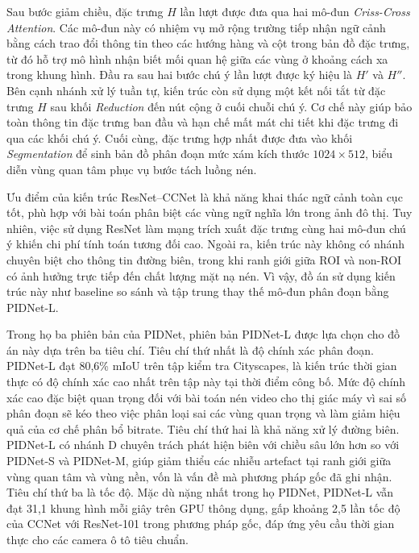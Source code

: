 Sau bước giảm chiều, đặc trưng $H$ lần lượt được đưa qua hai mô-đun \textit{Criss-Cross Attention}. Các mô-đun này có nhiệm vụ mở rộng trường tiếp nhận ngữ cảnh bằng cách trao đổi thông tin theo các hướng hàng và cột trong bản đồ đặc trưng, từ đó hỗ trợ mô hình nhận biết mối quan hệ giữa các vùng ở khoảng cách xa trong khung hình. Đầu ra sau hai bước chú ý lần lượt được ký hiệu là $H'$ và $H''$. Bên cạnh nhánh xử lý tuần tự, kiến trúc còn sử dụng một kết nối tắt từ đặc trưng $H$ sau khối \textit{Reduction} đến nút cộng ở cuối chuỗi chú ý. Cơ chế này giúp bảo toàn thông tin đặc trưng ban đầu và hạn chế mất mát chi tiết khi đặc trưng đi qua các khối chú ý. Cuối cùng, đặc trưng hợp nhất được đưa vào khối \textit{Segmentation} để sinh bản đồ phân đoạn mức xám kích thước $1024\times512$, biểu diễn vùng quan tâm phục vụ bước tách luồng nén.




Ưu điểm của kiến trúc ResNet--CCNet là khả năng khai thác ngữ cảnh toàn cục tốt, phù hợp với bài toán phân biệt các vùng ngữ nghĩa lớn trong ảnh đô thị. Tuy nhiên, việc sử dụng ResNet làm mạng trích xuất đặc trưng cùng hai mô-đun chú ý khiến chi phí tính toán tương đối cao. Ngoài ra, kiến trúc này không có nhánh chuyên biệt cho thông tin đường biên, trong khi ranh giới giữa ROI và non-ROI có ảnh hưởng trực tiếp đến chất lượng mặt nạ nén. Vì vậy, đồ án sử dụng kiến trúc này như baseline so sánh và tập trung thay thế mô-đun phân đoạn bằng PIDNet-L.


Trong họ ba phiên bản của PIDNet, phiên bản PIDNet-L được lựa chọn cho đồ án này dựa trên ba tiêu chí. Tiêu chí thứ nhất là độ chính xác phân đoạn. PIDNet-L đạt 80,6\% mIoU trên tập kiểm tra Cityscapes, là kiến trúc thời gian thực có độ chính xác cao nhất trên tập này tại thời điểm công bố. Mức độ chính xác cao đặc biệt quan trọng đối với bài toán nén video cho thị giác máy vì sai số phân đoạn sẽ kéo theo việc phân loại sai các vùng quan trọng và làm giảm hiệu quả của cơ chế phân bổ bitrate. Tiêu chí thứ hai là khả năng xử lý đường biên. PIDNet-L có nhánh D chuyên trách phát hiện biên với chiều sâu lớn hơn so với PIDNet-S và PIDNet-M, giúp giảm thiểu các nhiễu artefact tại ranh giới giữa vùng quan tâm và vùng nền, vốn là vấn đề mà phương pháp gốc đã ghi nhận. Tiêu chí thứ ba là tốc độ. Mặc dù nặng nhất trong họ PIDNet, PIDNet-L vẫn đạt 31,1 khung hình mỗi giây trên GPU thông dụng, gấp khoảng 2,5 lần tốc độ của CCNet với ResNet-101 trong phương pháp gốc, đáp ứng yêu cầu thời gian thực cho các camera ô tô tiêu chuẩn.

